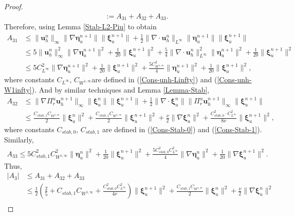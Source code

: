 \documentclass[10pt,twoside,openany,UTF8,CJK]{article}
\begin{document}
\begin{proof}
$$\begin{aligned}
		&:= A_{31} + A_{32} + A_{33}.
    \end{aligned}
    $$			
	Therefore, using Lemma \ref{Stab-L2-Piu} to obtain
	$$
	\begin{aligned}
		A_{31} &\leq \|\boldsymbol{u}^n_h\|_{\infty}\|\nabla\boldsymbol{\eta}^{n+1}_u\|\|\boldsymbol{\xi}^{n+1}_u\| + \frac12\|\nabla\cdot \boldsymbol{u}^n_h\|_{L^{\infty}}\|\boldsymbol{\eta}^{n+1}_u\|\|\boldsymbol{\xi}^{n+1}_u\| \\
		&\leq 5\|\boldsymbol{u}^n_h\|^2_{\infty}\|\nabla\boldsymbol{\eta}^{n+1}_u\|^2 + \frac{1}{20}\|\boldsymbol{\xi}^{n+1}_u\|^2 + \frac54\|\nabla\cdot \boldsymbol{u}^n_h\|^2_{L^{\infty}}\|\boldsymbol{\eta}^{n+1}_u\|^2 + \frac{1}{20}\|\boldsymbol{\xi}^{n+1}_u\|^2 \\
		&\leq 5C^2_{L^{\infty}}\|\nabla\boldsymbol{\eta}^{n+1}_u\|^2 + \frac{1}{20}\|\boldsymbol{\xi}^{n+1}_u\|^2	+ \frac{5C^2_{W^{1,\infty}}}{4}\|\boldsymbol{\eta}^{n+1}_u\|^2 + \frac{1}{20}\|\boldsymbol{\xi}^{n+1}_u\|^2,
    \end{aligned}
    $$		
	where constants $C_{L^{\infty}}$, $C_{W^{1,\infty}}$are defined in (\ref{Cons-unh-Linfty}) and (\ref{Cons-unh-W1infty}). And by similar techniques and Lemma \ref{Lemma-Stab},
	$$
	\begin{aligned}
		A_{32} &\leq \|\nabla\Pi^u_r\boldsymbol{u}^{n+1}_h\|_{\infty}\|\boldsymbol{\xi}^{n}_u\|\|\boldsymbol{\xi}^{n+1}_u\| + \frac12\|\nabla\cdot \boldsymbol{\xi}^n_u\|\|\Pi^u_r\boldsymbol{u}^{n+1}_h\|_{\infty}\|\boldsymbol{\xi}^{n+1}_u\| \\
		&\leq \frac{C_{stab,1} C_{W^{1,\infty}}}{2}\|\boldsymbol{\xi}^n_u\|^2 + \frac{C_{stab,1} C_{W^{1,\infty}}}{2}\|\boldsymbol{\xi}^{n+1}_u\|^2 + \frac{\nu}{2}\|\nabla\boldsymbol{\xi}^n_u\|^2 + \frac{C^2_{stab,0}\cdot C^2_{L^{\infty}}}{8\nu}\|\boldsymbol{\xi}^{n+1}_u\|^2,
	\end{aligned}
	$$	
	where constants $C_{stab,0}$, $C_{stab,1}$ are defined in (\ref{Cons-Stab-0}) and (\ref{Cons-Stab-1}). Similarly, 
	$$
	\begin{aligned}
		A_{33} \leq 5C^2_{stab,1} C^2_{W^{1,\infty}}\|\boldsymbol{\eta}^n_u\|^2 + \frac{1}{20}\|\boldsymbol{\xi}^{n+1}_u\|^2 + \frac{5C^2_{stab,0} C^2_{L^{\infty}}}{4}\|\nabla\boldsymbol{\eta}^{n}_u\|^2 + \frac{1}{20}\|\nabla\boldsymbol{\xi}^{n+1}_u\|^2.
	\end{aligned}
	$$		
	Thus,
	$$
	\begin{aligned}		
		|A_3| &\leq A_{31} + A_{32} + A_{33} \\
		&\leq \frac12\left(\frac25 + C_{stab,1} C_{W^{1,\infty}} + \frac{C^2_{stab,0} C^2_{L^{\infty}}}{4\nu}\right)\|\boldsymbol{\xi}^{n+1}_u\|^2 + \frac{C_{stab,1} C_{W^{1,\infty}}}{2}\|\boldsymbol{\xi}^n_u\|^2 + \frac{\nu}{2}\|\nabla\boldsymbol{\xi}^n_u\|^2 \\

\end{aligned}$$
\end{proof}
\end{document}
